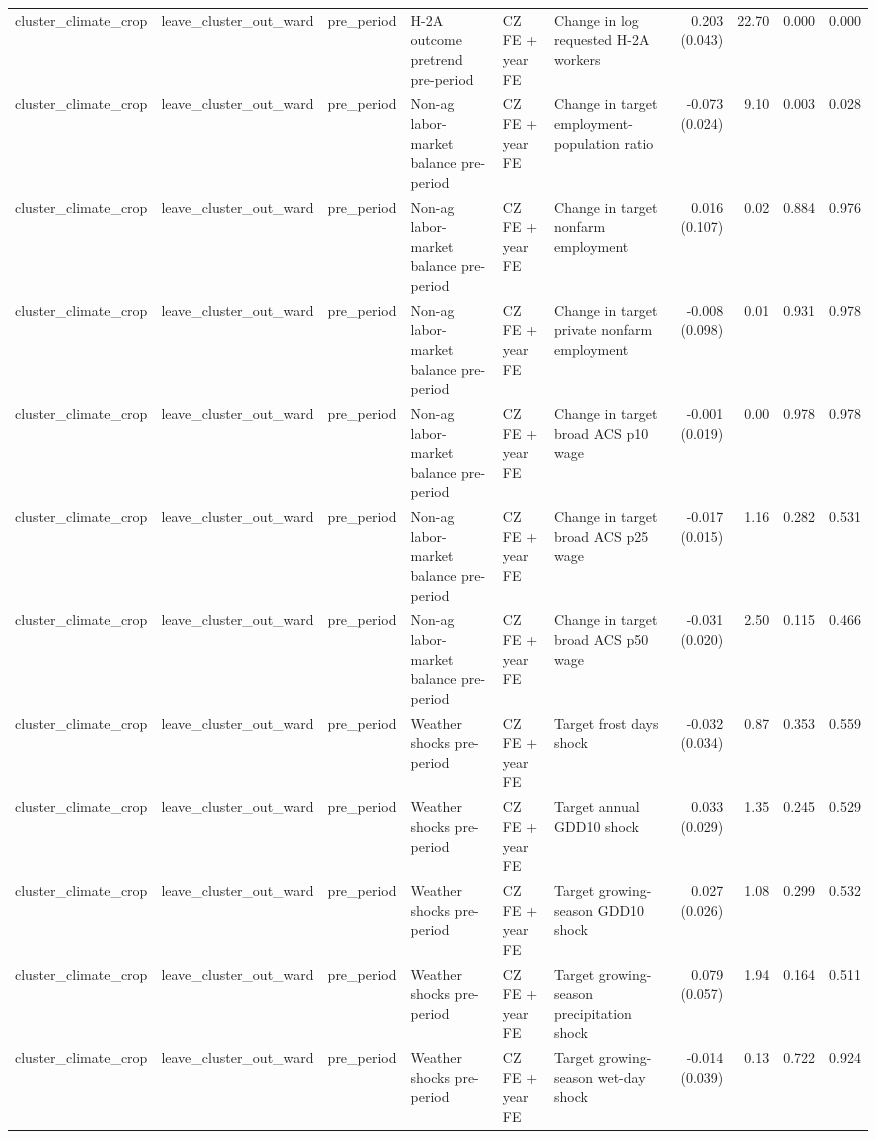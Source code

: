 \begin{tabular}{llllllrrrr}
cluster_climate_crop & leave_cluster_out_ward & pre_period & H-2A outcome pretrend pre-period & CZ FE + year FE & Change in log requested H-2A workers & 0.203 (0.043) & 22.70 & 0.000 & 0.000 \\
cluster_climate_crop & leave_cluster_out_ward & pre_period & Non-ag labor-market balance pre-period & CZ FE + year FE & Change in target employment-population ratio & -0.073 (0.024) & 9.10 & 0.003 & 0.028 \\
cluster_climate_crop & leave_cluster_out_ward & pre_period & Non-ag labor-market balance pre-period & CZ FE + year FE & Change in target nonfarm employment & 0.016 (0.107) & 0.02 & 0.884 & 0.976 \\
cluster_climate_crop & leave_cluster_out_ward & pre_period & Non-ag labor-market balance pre-period & CZ FE + year FE & Change in target private nonfarm employment & -0.008 (0.098) & 0.01 & 0.931 & 0.978 \\
cluster_climate_crop & leave_cluster_out_ward & pre_period & Non-ag labor-market balance pre-period & CZ FE + year FE & Change in target broad ACS p10 wage & -0.001 (0.019) & 0.00 & 0.978 & 0.978 \\
cluster_climate_crop & leave_cluster_out_ward & pre_period & Non-ag labor-market balance pre-period & CZ FE + year FE & Change in target broad ACS p25 wage & -0.017 (0.015) & 1.16 & 0.282 & 0.531 \\
cluster_climate_crop & leave_cluster_out_ward & pre_period & Non-ag labor-market balance pre-period & CZ FE + year FE & Change in target broad ACS p50 wage & -0.031 (0.020) & 2.50 & 0.115 & 0.466 \\
cluster_climate_crop & leave_cluster_out_ward & pre_period & Weather shocks pre-period & CZ FE + year FE & Target frost days shock & -0.032 (0.034) & 0.87 & 0.353 & 0.559 \\
cluster_climate_crop & leave_cluster_out_ward & pre_period & Weather shocks pre-period & CZ FE + year FE & Target annual GDD10 shock & 0.033 (0.029) & 1.35 & 0.245 & 0.529 \\
cluster_climate_crop & leave_cluster_out_ward & pre_period & Weather shocks pre-period & CZ FE + year FE & Target growing-season GDD10 shock & 0.027 (0.026) & 1.08 & 0.299 & 0.532 \\
cluster_climate_crop & leave_cluster_out_ward & pre_period & Weather shocks pre-period & CZ FE + year FE & Target growing-season precipitation shock & 0.079 (0.057) & 1.94 & 0.164 & 0.511 \\
cluster_climate_crop & leave_cluster_out_ward & pre_period & Weather shocks pre-period & CZ FE + year FE & Target growing-season wet-day shock & -0.014 (0.039) & 0.13 & 0.722 & 0.924 \\

\end{tabular}
